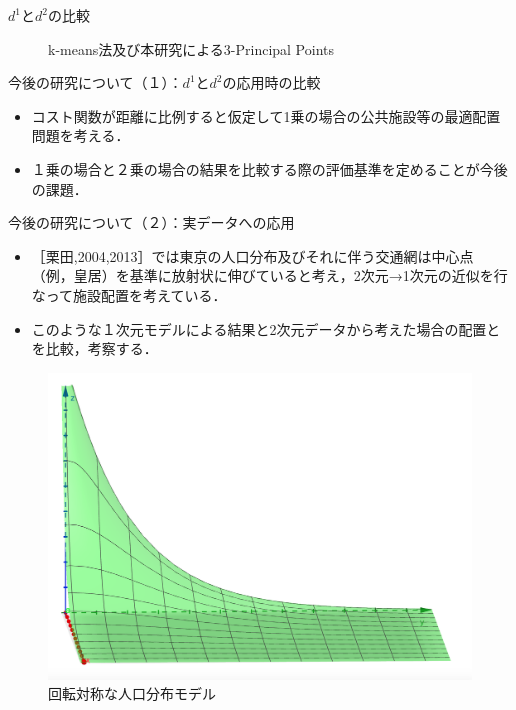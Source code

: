 \documentclass[unicode,11pt]{beamer}
\begin{document}
\begin{frame}{$d^1$と$d^2$の比較}
\begin{figure}[htbp]
\begin{minipage}[b]{0.45\linewidth}
            \caption{k-means法及び本研究による3-Principal Points}
        \end{minipage}
    \end{figure}
\end{frame}

\begin{frame}{今後の研究について（１）：$d^1$と$d^2$の応用時の比較}
    \begin{itemize}
        \item コスト関数が距離に比例すると仮定して1乗の場合の公共施設等の最適配置問題を考える．
        \item １乗の場合と２乗の場合の結果を比較する際の評価基準を定めることが今後の課題．
    \end{itemize}
\end{frame}
\begin{frame}{今後の研究について（２）：実データへの応用}
    \begin{itemize}
        \item ［栗田,2004,2013］では東京の人口分布及びそれに伴う交通網は中心点（例，皇居）を基準に放射状に伸びていると考え，2次元→1次元の近似を行なって施設配置を考えている．
        \item このような１次元モデルによる結果と2次元データから考えた場合の配置とを比較，考察する．
    \end{itemize}
    \begin{figure}[htbp]
        \begin{minipage}[b]{0.45\linewidth}
            \centering
            \includegraphics[keepaspectratio, scale=0.15]{z=e-u.png}
            \caption{回転対称な人口分布モデル}
        \end{minipage}

\end{figure}
\end{frame}
\end{document}

